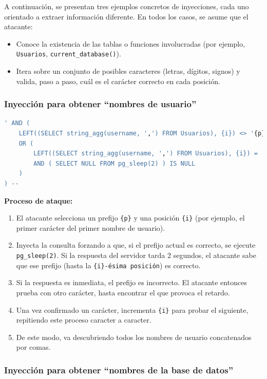 \documentclass[a4paper,12pt]{article}
\begin{document}
A continuación, se presentan tres ejemplos concretos de inyecciones, cada uno orientado a extraer información diferente. En todos los casos, se asume que el atacante:
\begin{itemize}
    \item Conoce la existencia de las tablas o funciones involucradas (por ejemplo, \texttt{Usuarios}, \texttt{current\_database()}).
    \item Itera sobre un conjunto de posibles caracteres (letras, dígitos, signos) y valida, paso a paso, cuál es el carácter correcto en cada posición.
\end{itemize}

\subsubsection*{Inyección para obtener ``nombres de usuario''}

\begin{lstlisting}[language=SQL]
' AND ( 
    LEFT((SELECT string_agg(username, ',') FROM Usuarios), {i}) <> '{p}' 
    OR ( 
        LEFT((SELECT string_agg(username, ',') FROM Usuarios), {i}) = '{p}' 
        AND ( SELECT NULL FROM pg_sleep(2) ) IS NULL 
    ) 
) --
\end{lstlisting}

\textbf{Proceso de ataque:}
\begin{enumerate}
    \item El atacante selecciona un prefijo \texttt{\{p\}} y una posición \texttt{\{i\}} (por ejemplo, el primer carácter del primer nombre de usuario).
    \item Inyecta la consulta forzando a que, si el prefijo actual es correcto, se ejecute \texttt{pg\_sleep(2)}. Si la respuesta del servidor tarda 2 segundos, el atacante sabe que ese prefijo (hasta la \texttt{\{i\}-ésima posición}) es correcto.
    \item Si la respuesta es inmediata, el prefijo es incorrecto. El atacante entonces prueba con otro carácter, hasta encontrar el que provoca el retardo.
    \item Una vez confirmado un carácter, incrementa \texttt{\{i\}} para probar el siguiente, repitiendo este proceso caracter a caracter.
    \item De este modo, va descubriendo todos los nombres de usuario concatenados por comas.
\end{enumerate}

\subsubsection*{Inyección para obtener ``nombres de la base de datos''}
\end{document}
